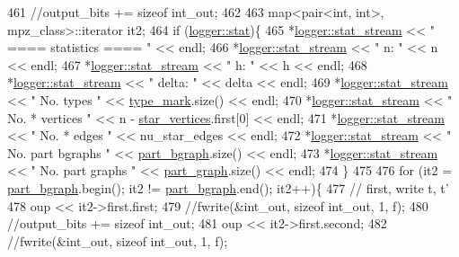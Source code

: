 \begin{DoxyCode}
461   \textcolor{comment}{//output\_bits += sizeof int\_out;}
462 
463   map<pair<int, int>, mpz\_class>::iterator it2;
464   \textcolor{keywordflow}{if} (\hyperlink{classlogger_a26812b5ba03f130e8dae3446d5fc032f}{logger::stat})\{
465     *\hyperlink{classlogger_a7db37821f875f2ba3540980b355779f5}{logger::stat\_stream} << \textcolor{stringliteral}{" ==== statistics ==== "} << endl;
466     *\hyperlink{classlogger_a7db37821f875f2ba3540980b355779f5}{logger::stat\_stream} << \textcolor{stringliteral}{" n:                "} << n << endl;
467     *\hyperlink{classlogger_a7db37821f875f2ba3540980b355779f5}{logger::stat\_stream} << \textcolor{stringliteral}{" h:                "} << h << endl;
468     *\hyperlink{classlogger_a7db37821f875f2ba3540980b355779f5}{logger::stat\_stream} << \textcolor{stringliteral}{" delta:            "} << delta << endl;
469     *\hyperlink{classlogger_a7db37821f875f2ba3540980b355779f5}{logger::stat\_stream} << \textcolor{stringliteral}{" No. types         "} << 
      \hyperlink{classmarked__graph__compressed_a86b00223525703e973415cbc9c94da68}{type\_mark}.size() << endl;
470     *\hyperlink{classlogger_a7db37821f875f2ba3540980b355779f5}{logger::stat\_stream} << \textcolor{stringliteral}{" No. * vertices    "} << n - 
      \hyperlink{classmarked__graph__compressed_a7a4ced4586e2e353f9076bd447df5208}{star\_vertices}.first[0] << endl;
471     *\hyperlink{classlogger_a7db37821f875f2ba3540980b355779f5}{logger::stat\_stream} << \textcolor{stringliteral}{" No. * edges       "} << nu\_star\_edges << endl;
472     *\hyperlink{classlogger_a7db37821f875f2ba3540980b355779f5}{logger::stat\_stream} << \textcolor{stringliteral}{" No. part bgraphs  "} << 
      \hyperlink{classmarked__graph__compressed_a7b3267063fba30b45eb21b3ba4e07536}{part\_bgraph}.size() << endl;
473     *\hyperlink{classlogger_a7db37821f875f2ba3540980b355779f5}{logger::stat\_stream} << \textcolor{stringliteral}{" No. part graphs   "} << 
      \hyperlink{classmarked__graph__compressed_ae179a4737e6eab905c18a94d44ef64b7}{part\_graph}.size() << endl;
474   \}
475 
476   \textcolor{keywordflow}{for} (it2 = \hyperlink{classmarked__graph__compressed_a7b3267063fba30b45eb21b3ba4e07536}{part\_bgraph}.begin(); it2 != \hyperlink{classmarked__graph__compressed_a7b3267063fba30b45eb21b3ba4e07536}{part\_bgraph}.end(); it2++)\{
477     \textcolor{comment}{// first, write t, t'}
478     oup << it2->first.first;
479     \textcolor{comment}{//fwrite(&int\_out, sizeof int\_out, 1, f);}
480     \textcolor{comment}{//output\_bits += sizeof int\_out;}
481     oup <<  it2->first.second;
482     \textcolor{comment}{//fwrite(&int\_out, sizeof int\_out, 1, f);}

\end{DoxyCode}
